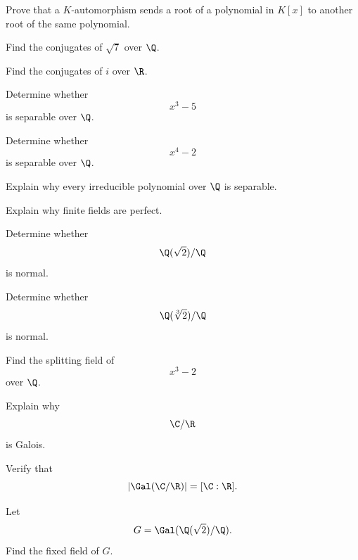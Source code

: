 \begin{exercise}[2]
Prove that a \(K\)-automorphism sends a root of a polynomial in \(K[x]\) to
another root of the same polynomial.
\end{exercise}

\begin{exercise}[1]
Find the conjugates of \(\sqrt7\) over \(\Q\).
\end{exercise}

\begin{exercise}[1]
Find the conjugates of \(i\) over \(\R\).
\end{exercise}

\begin{exercise}[2]
Determine whether
\[ x^3-5 \]
is separable over \(\Q\).
\end{exercise}

\begin{exercise}[2]
Determine whether
\[ x^4-2 \]
is separable over \(\Q\).
\end{exercise}

\begin{exercise}[2]
Explain why every irreducible polynomial over \(\Q\) is separable.
\end{exercise}

\begin{exercise}[2]
Explain why finite fields are perfect.
\end{exercise}

\begin{exercise}[2]
Determine whether
\[ \Q(\sqrt2)/\Q \]
is normal.
\end{exercise}

\begin{exercise}[2]
Determine whether
\[ \Q(\sqrt[3]{2})/\Q \]
is normal.
\end{exercise}

\begin{exercise}[2]
Find the splitting field of
\[ x^3-2 \]
over \(\Q\).
\end{exercise}

\begin{exercise}[2]
Explain why
\[ \C/\R \]
is Galois.
\end{exercise}

\begin{exercise}[2]
Verify that
\[ |\Gal(\C/\R)|=[\C:\R]. \]
\end{exercise}

\begin{exercise}[2]
Let
\[ G=\Gal(\Q(\sqrt2)/\Q). \]
Find the fixed field of \(G\).
\end{exercise}

